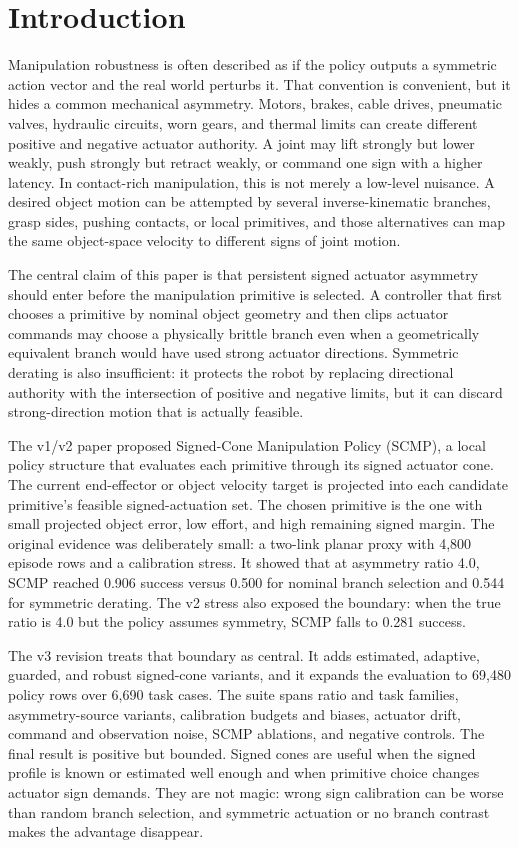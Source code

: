 \documentclass{article}
\begin{document}
\section{Introduction}

Manipulation robustness is often described as if the policy outputs a symmetric action vector and the real world perturbs it. That convention is convenient, but it hides a common mechanical asymmetry. Motors, brakes, cable drives, pneumatic valves, hydraulic circuits, worn gears, and thermal limits can create different positive and negative actuator authority. A joint may lift strongly but lower weakly, push strongly but retract weakly, or command one sign with a higher latency. In contact-rich manipulation, this is not merely a low-level nuisance. A desired object motion can be attempted by several inverse-kinematic branches, grasp sides, pushing contacts, or local primitives, and those alternatives can map the same object-space velocity to different signs of joint motion.

The central claim of this paper is that persistent signed actuator asymmetry should enter before the manipulation primitive is selected. A controller that first chooses a primitive by nominal object geometry and then clips actuator commands may choose a physically brittle branch even when a geometrically equivalent branch would have used strong actuator directions. Symmetric derating is also insufficient: it protects the robot by replacing directional authority with the intersection of positive and negative limits, but it can discard strong-direction motion that is actually feasible.

The v1/v2 paper proposed Signed-Cone Manipulation Policy (SCMP), a local policy structure that evaluates each primitive through its signed actuator cone. The current end-effector or object velocity target is projected into each candidate primitive's feasible signed-actuation set. The chosen primitive is the one with small projected object error, low effort, and high remaining signed margin. The original evidence was deliberately small: a two-link planar proxy with 4,800 episode rows and a calibration stress. It showed that at asymmetry ratio 4.0, SCMP reached 0.906 success versus 0.500 for nominal branch selection and 0.544 for symmetric derating. The v2 stress also exposed the boundary: when the true ratio is 4.0 but the policy assumes symmetry, SCMP falls to 0.281 success.

The v3 revision treats that boundary as central. It adds estimated, adaptive, guarded, and robust signed-cone variants, and it expands the evaluation to 69,480 policy rows over 6,690 task cases. The suite spans ratio and task families, asymmetry-source variants, calibration budgets and biases, actuator drift, command and observation noise, SCMP ablations, and negative controls. The final result is positive but bounded. Signed cones are useful when the signed profile is known or estimated well enough and when primitive choice changes actuator sign demands. They are not magic: wrong sign calibration can be worse than random branch selection, and symmetric actuation or no branch contrast makes the advantage disappear.
\end{document}
